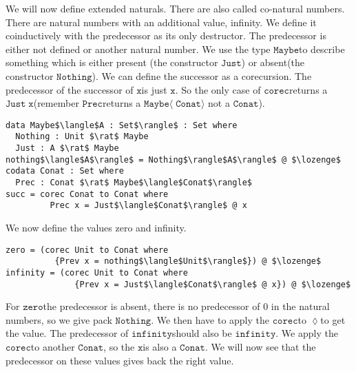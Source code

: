 \documentclass[a4paper,cleardoubleempty,BCOR1cm]{scrbook}
\begin{document}
We will now define extended naturals. There are also called co-natural numbers.
There are natural numbers with an additional value, infinity. We define it
coinductively with the predecessor as its only destructor. The predecessor is
either not defined or another natural number. We use the type $\mathtt{Maybe}$\;to
describe something which is either present (the constructor $\mathtt{Just}$) or
absent(the constructor $\mathtt{Nothing}$). We can define the successor as a
corecursion. The predecessor of the successor of $\mathtt{x}$\;is just $\mathtt{x}$. So the only
case of $\mathtt{corec}$\;returns a $\mathtt{Just\;x}$\;(remember $\mathtt{Prec}$\;returns a $\mathtt{Maybe\langle\;Conat\rangle}$
not a $\mathtt{Conat}$).
\begin{lstlisting}
data Maybe$\langle$A : Set$\rangle$ : Set where
  Nothing : Unit $\rat$ Maybe
  Just : A $\rat$ Maybe
nothing$\langle$A$\rangle$ = Nothing$\rangle$A$\rangle$ @ $\lozenge$
codata Conat : Set where
  Prec : Conat $\rat$ Maybe$\langle$Conat$\rangle$
succ = corec Conat to Conat where
         Prec x = Just$\langle$Conat$\rangle$ @ x
\end{lstlisting}
We now define the values zero and infinity.
\begin{lstlisting}
zero = (corec Unit to Conat where
          {Prev x = nothing$\langle$Unit$\rangle$}) @ $\lozenge$
infinity = (corec Unit to Conat where
              {Prev x = Just$\langle$Conat$\rangle$ @ x}) @ $\lozenge$
\end{lstlisting}
For $\mathtt{zero}$\;the predecessor is absent, there is no predecessor of 0 in the
natural numbers, so we give pack $\mathtt{Nothing}$.  We then have to apply the
$\mathtt{corec}$\;to $\mathtt{\lozenge}$\;to get the value.  The predecessor of $\mathtt{infinity}$\;should also
be $\mathtt{infinity}$.  We apply the $\mathtt{corec}$\;to another $\mathtt{Conat}$, so the $\mathtt{x}$\;is also a
$\mathtt{Conat}$.  We will now see that the predecessor on these values gives back the
right value.
\end{document}
